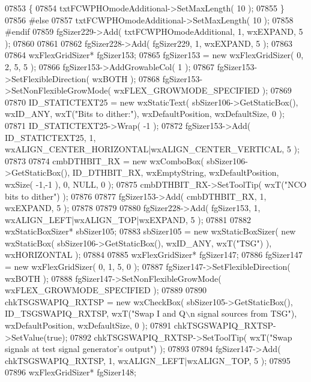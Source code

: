 \begin{DoxyCode}
07853     \{
07854     txtFCWPHOmodeAdditional->SetMaxLength( 10 );
07855     \}
07856 \textcolor{preprocessor}{    #else}
07857     txtFCWPHOmodeAdditional->SetMaxLength( 10 );
07858 \textcolor{preprocessor}{    #endif}
07859     fgSizer229->Add( txtFCWPHOmodeAdditional, 1, wxEXPAND, 5 );
07860     
07861     
07862     fgSizer228->Add( fgSizer229, 1, wxEXPAND, 5 );
07863     
07864     wxFlexGridSizer* fgSizer153;
07865     fgSizer153 = \textcolor{keyword}{new} wxFlexGridSizer( 0, 2, 5, 5 );
07866     fgSizer153->AddGrowableCol( 1 );
07867     fgSizer153->SetFlexibleDirection( wxBOTH );
07868     fgSizer153->SetNonFlexibleGrowMode( wxFLEX\_GROWMODE\_SPECIFIED );
07869     
07870     ID_STATICTEXT25 = \textcolor{keyword}{new} wxStaticText( sbSizer106->GetStaticBox(), wxID\_ANY, wxT(\textcolor{stringliteral}{"Bits to dither:"}), 
      wxDefaultPosition, wxDefaultSize, 0 );
07871     ID_STATICTEXT25->Wrap( -1 );
07872     fgSizer153->Add( ID_STATICTEXT25, 1, wxALIGN\_CENTER\_HORIZONTAL|wxALIGN\_CENTER\_VERTICAL, 5 );
07873     
07874     cmbDTHBIT_RX = \textcolor{keyword}{new} wxComboBox( sbSizer106->GetStaticBox(), ID_DTHBIT_RX, wxEmptyString, 
      wxDefaultPosition, wxSize( -1,-1 ), 0, NULL, 0 ); 
07875     cmbDTHBIT_RX->SetToolTip( wxT(\textcolor{stringliteral}{"NCO bits to dither"}) );
07876     
07877     fgSizer153->Add( cmbDTHBIT_RX, 1, wxEXPAND, 5 );
07878     
07879     
07880     fgSizer228->Add( fgSizer153, 1, wxALIGN\_LEFT|wxALIGN\_TOP|wxEXPAND, 5 );
07881     
07882     wxStaticBoxSizer* sbSizer105;
07883     sbSizer105 = \textcolor{keyword}{new} wxStaticBoxSizer( \textcolor{keyword}{new} wxStaticBox( sbSizer106->GetStaticBox(), wxID\_ANY, wxT(\textcolor{stringliteral}{"TSG"}) ),
       wxHORIZONTAL );
07884     
07885     wxFlexGridSizer* fgSizer147;
07886     fgSizer147 = \textcolor{keyword}{new} wxFlexGridSizer( 0, 1, 5, 0 );
07887     fgSizer147->SetFlexibleDirection( wxBOTH );
07888     fgSizer147->SetNonFlexibleGrowMode( wxFLEX\_GROWMODE\_SPECIFIED );
07889     
07890     chkTSGSWAPIQ_RXTSP = \textcolor{keyword}{new} wxCheckBox( sbSizer105->GetStaticBox(), 
      ID_TSGSWAPIQ_RXTSP, wxT(\textcolor{stringliteral}{"Swap I and Q\(\backslash\)n signal sources from TSG"}), wxDefaultPosition, wxDefaultSize, 0 );
07891     chkTSGSWAPIQ_RXTSP->SetValue(\textcolor{keyword}{true}); 
07892     chkTSGSWAPIQ_RXTSP->SetToolTip( wxT(\textcolor{stringliteral}{"Swap signals at test signal generator's output"}) );
07893     
07894     fgSizer147->Add( chkTSGSWAPIQ_RXTSP, 1, wxALIGN\_LEFT|wxALIGN\_TOP, 5 );
07895     
07896     wxFlexGridSizer* fgSizer148;

\end{DoxyCode}
